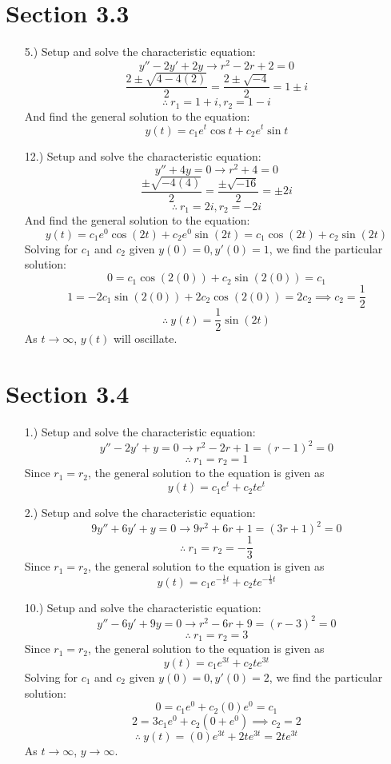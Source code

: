 \documentclass[12pt]{article}
\begin{document}
\section*{Section 3.3}
\begin{itemize}
    \item [5.)] Setup and solve the characteristic equation:
    \[y''-2y'+2y\to r^2-2r+2=0\]
    \[\frac{2\pm\sqrt{4-4(2)}}{2}=\frac{2\pm\sqrt{-4}}{2}=1\pm i\]
    \[\therefore\ r_1=1+i,r_2=1-i\]
    And find the general solution to the equation:
    \[y(t)=c_1e^{t}\cos t+c_2e^{t}\sin t\]
    \item [12.)] Setup and solve the characteristic equation:
    \[y''+4y=0\to r^2+4=0\]
    \[\frac{\pm\sqrt{-4(4)}}{2}=\frac{\pm{\sqrt{-16}}}{2}=\pm2i\]
    \[\therefore\ r_1=2i,r_2=-2i\]
    And find the general solution to the equation:
    \[y(t)=c_1e^0\cos(2t)+c_2e^0\sin(2t)=c_1\cos(2t)+c_2\sin(2t)\]
    Solving for $c_1$ and $c_2$ given $y(0)=0,y'(0)=1$, we find the particular solution:
    \[0=c_1\cos(2(0))+c_2\sin(2(0))=c_1\]
    \[1=-2c_1\sin(2(0))+2c_2\cos(2(0))=2c_2\implies c_2=\frac{1}{2}\]
    \[\therefore\ y(t)=\frac{1}{2}\sin(2t)\]
    As $t\to\infty$, $y(t)$ will oscillate.
\end{itemize}
\section*{Section 3.4}
\begin{itemize}
    \item [1.)] Setup and solve the characteristic equation:
    \[y''-2y'+y=0\to r^2-2r+1=(r-1)^2=0\]
    \[\therefore\ r_1=r_2=1\]
    Since $r_1=r_2$, the general solution to the equation is given as
    \[y(t)=c_1e^t+c_2te^t\]

    \item [2.)] Setup and solve the characteristic equation:
    \[9y''+6y'+y=0\to 9r^2+6r+1=(3r+1)^2=0\]
    \[\therefore\ r_1=r_2=-\frac{1}{3}\]
    Since $r_1=r_2$, the general solution to the equation is given as
    \[y(t)=c_1e^{-\frac{1}{3}t}+c_2te^{-\frac{1}{3}t}\]

    \item [10.)] Setup and solve the characteristic equation:
    \[y''-6y'+9y=0\to r^2-6r+9=(r-3)^2=0\]
    \[\therefore\ r_1=r_2=3\]
    Since $r_1=r_2$, the general solution to the equation is given as
    \[y(t)=c_1e^{3t}+c_2te^{3t}\]
    Solving for $c_1$ and $c_2$ given $y(0)=0,y'(0)=2$, we find the particular solution:
    \[0=c_1e^0+c_2(0)e^0=c_1\]
    \[2=3c_1e^{0}+c_2(0+e^{0})\implies c_2=2\]
    \[\therefore\ y(t)=(0)e^{3t}+2te^{3t}=2te^{3t}\]
    As $t\to\infty$, $y\to\infty$.
\end{itemize}
\end{document}
